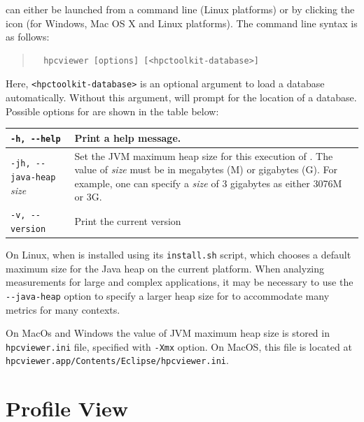 \hpcviewer{} can either be launched from a command line (Linux platforms) or by clicking the \hpcviewer{} icon (for Windows, Mac OS X and Linux platforms).
The command line syntax is as follows:
\begin{quote}
\begin{verbatim}
  hpcviewer [options] [<hpctoolkit-database>]
\end{verbatim}
\end{quote}
Here, \texttt{<hpctoolkit-database>} is an optional argument to load a database automatically.
Without this argument, \hpcviewer{} will prompt for the location of a database. Possible options for \hpcviewer{}  are shown in the table below:\\

\begin{centering}
\begin{tabular}{|l|p{4.1in}|}\hline\hline
 \verb|-h, --help|   &
 	Print a help message. \\\hline
 \verb|-jh, --java-heap| {\em size}  &
  	Set the JVM maximum heap size for this execution of  \hpcviewer{}. The value of {\em size} must be
	in megabytes (M) or gigabytes (G). For example, one can specify a {\em size}  of 3 gigabytes as either
	3076M or 3G.\\\hline
 \verb|-v, --version|   &
	Print the current version\\\hline\hline
 \end{tabular}
 \end{centering}
 \vspace{2ex}

On Linux, when  \hpcviewer{}  is installed using its \verb|install.sh| script, which chooses a default maximum size for the Java heap on the current platform. When analyzing measurements for large and complex applications, it may be necessary to use the \verb|--java-heap| option to specify a larger heap size for  \hpcviewer{}  to accommodate many metrics for many contexts.

On MacOs and Windows the value of JVM maximum heap size is stored in \texttt{hpcviewer.ini} file, specified with \texttt{-Xmx} option.
On MacOS, this file is located at \texttt{hpcviewer.app/Contents/Eclipse/hpcviewer.ini}.


\section{Profile View}
\label{sec:profile}

